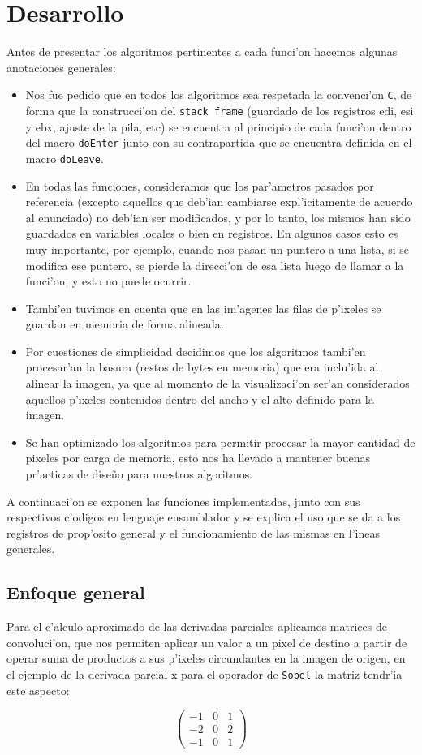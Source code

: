 \documentclass[11pt]{article}
\begin{document}
\section{Desarrollo}
Antes de presentar los algoritmos pertinentes a cada funci'on hacemos algunas anotaciones generales:
\begin{itemize}
\item Nos fue pedido que en todos los algoritmos sea respetada la convenci'on \verb'C', de forma que la construcci'on del \verb'stack frame' (guardado de los registros edi, esi y ebx, ajuste de la pila, etc) se encuentra al principio de cada funci'on dentro del macro \verb'doEnter' junto con su contrapartida que se encuentra definida en el macro \verb'doLeave'.
\item En todas las funciones, consideramos que los par'ametros pasados por referencia (excepto aquellos que deb'ian cambiarse expl'icitamente de acuerdo al enunciado) no deb'ian ser modificados, y por lo tanto, los mismos han sido guardados en variables locales o bien en registros. En algunos casos esto es muy importante, por ejemplo, cuando nos pasan un puntero a una lista, si se modifica ese puntero, se pierde la direcci'on de esa lista luego de llamar a la funci'on; y esto no puede ocurrir.
\item Tambi'en tuvimos en cuenta que en las im'agenes las filas de p'ixeles se guardan en memoria de forma alineada.
\item Por cuestiones de simplicidad decidimos que los algoritmos tambi'en procesar'an la basura (restos de bytes en memoria) que era inclu'ida al alinear la imagen, ya que al momento de la visualizaci'on ser'an considerados aquellos p'ixeles contenidos dentro del ancho y el alto definido para la imagen.
\item Se han optimizado los algoritmos para permitir procesar la mayor cantidad de pixeles por carga de memoria, esto nos ha llevado a mantener buenas pr'acticas de dise\~{n}o para nuestros algoritmos.
\end{itemize}
A continuaci'on se exponen las funciones implementadas, junto con sus respectivos c'odigos en lenguaje ensamblador y se explica el uso que se da a los registros de prop'osito general y el funcionamiento de las mismas en l'ineas generales.
\subsection{Enfoque general}
Para el c'alculo aproximado de las derivadas parciales aplicamos matrices de convoluci'on, que nos permiten aplicar un valor a un pixel de destino a partir de operar suma de productos a sus p'ixeles circundantes en la imagen de origen, en el ejemplo de la derivada parcial x para el operador de \verb'Sobel' la matriz tendr'ia este aspecto:
\begin{center}
\begin{minipage}{5in}
\[ \left( \begin{array}{ccc}
-1 & 0 & 1 \\
-2 & 0 & 2 \\
-1 & 0 & 1 \end{array} \right)\]
\end{minipage}
\end{center}
\end{document}
